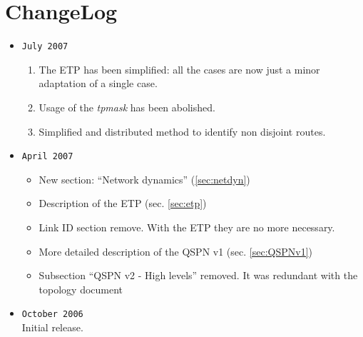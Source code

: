 \documentclass[a4paper]{article}
\begin{document}
\section{ChangeLog}
\begin{itemize}
	\item \verb|July 2007|
		\begin{enumerate}
			\item The ETP has been simplified: all the cases are 
				now just a minor adaptation of a single case.
			\item Usage of the \emph{tpmask} has been abolished.
			\item Simplified and distributed method to identify
				non disjoint routes.
		\end{enumerate}
	\item \verb|April 2007|
		\begin{itemize}
			\item New section: ``Network dynamics'' (\ref{sec:netdyn})
			\item Description of the ETP (sec.  \ref{sec:etp})
			\item Link ID section remove. With the ETP they are no
				more necessary.
			\item More detailed description of the QSPN v1 (sec. \ref{sec:QSPNv1})
			\item Subsection ``QSPN v2 - High levels'' removed. It
				was redundant with the topology
				document\cite{ntktopology}
		\end{itemize}
	\item \verb|October 2006|\\
		Initial release.
\end{itemize}

\end{document}
